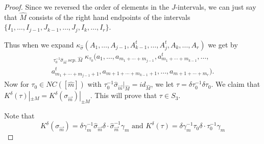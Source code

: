 \documentclass[11pt]{amsart}
\theoremstyle{definition}
\numberwithin{theorem}{section}
\newcommand{\NC}{\mathit{NC}}
\newcommand{\vm}{{\vec{m}}}
\newcommand{\sz}{{\scriptscriptstyle0}}
\newcommand{\sep}{\mathit{\ sep.\ }}
\newcommand{\id}{\mathit{id}}
\newcommand{\ab}{\allowbreak}
\begin{document}
\begin{proof}
Since we reversed the order of elements in the
$J$-intervals, we can just say that $\widehat{M}$ consists
of the right hand endpoints of the intervals $\{I_1, \dots,
I_{j-1},\ab J_{k-1}, \dots, J_j, I_k, \dots, I_r\}$.

Thus when we expand $\kappa_{\hat\sigma}(A_1, \dots,
A_{j-1}, A_{k-1}^t, \dots, A_j^t, A_k, \dots, A_r)$ we get
by \cite[Thm.~15]{mst}
\begin{multline}\label{eq:local product expansion} 
\mathop{\sum_{\tau_\sz \in \NC([\hat m])}}_
{\tau_\sz^{-1} \hat\sigma_\vm \sep \widehat M}
\kappa_{\tau_\sz}(a_1, \dots, a_{m_1 + \cdots + m_{j-1}},
a_{m_1 + \cdots + m_{k-1}}^t, \dots, \\ 
a_{m_1 + \cdots + m_{j-1}+1}^t,
a_{m+1 + \cdots + m_{k-1}+1}, \dots, a_{m+1 + \cdots + m_r}).
\end{multline}
Now for $\tau_\sz \in \NC([\hat m])$ with $\tau_\sz^{-1}\hat
\sigma_\vm |_{\widehat M} = \id_{\widehat M}$, we let $\tau
= \delta \tau_\sz^{-1} \delta \tau_\sz$. We claim that
$K^\delta(\tau)|_{\pm M} = K^\delta(\sigma_\vm)|_{\pm
  M}$. This will prove that $\tau \in S_3$.

Note that 
\[
K^\delta(\sigma_\vm)  = \delta \gamma_m^{-1} \hat\sigma_\vm  \delta \cdot \hat\sigma_\vm^{-1} \gamma_m
\mbox{\ and\ } 
K^\delta(\tau)  = \delta \gamma_m^{-1} \tau_\sz \delta \cdot \tau_\sz^{-1}\gamma_m 
\]




\end{proof}
\end{document}
